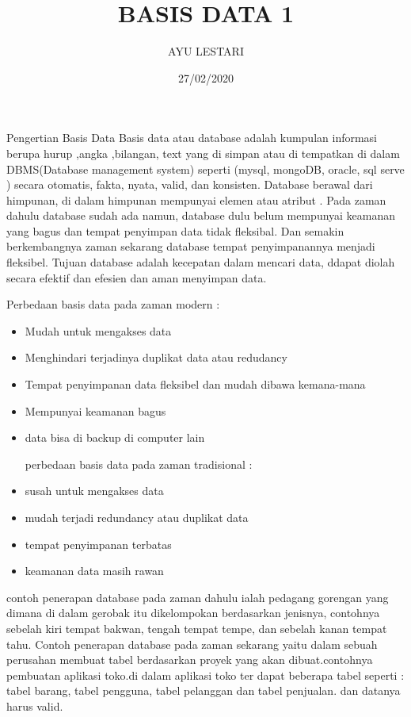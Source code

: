 \documentclass[12pt]{article}
\title{BASIS DATA 1}
\author{AYU LESTARI}
\date{27/02/2020}
\begin{document}
\maketitle
Pengertian Basis Data
Basis data atau database adalah kumpulan informasi berupa  hurup ,angka ,bilangan, text yang di simpan atau di tempatkan di dalam DBMS(Database management system)  seperti (mysql, mongoDB, oracle, sql serve ) secara otomatis, fakta, nyata, valid, dan konsisten. Database berawal dari himpunan, di dalam himpunan mempunyai  elemen atau atribut .  Pada zaman dahulu database sudah ada namun, database dulu belum mempunyai keamanan yang bagus dan tempat penyimpan data tidak fleksibal. Dan semakin berkembangnya zaman  sekarang database tempat penyimpanannya menjadi fleksibel. Tujuan database adalah kecepatan dalam mencari data, ddapat diolah secara efektif dan efesien  dan aman menyimpan data.

Perbedaan   basis data  pada zaman modern :
\begin{itemize}
  \item	Mudah untuk  mengakses data 
  \item Menghindari terjadinya duplikat data atau redudancy
  \item Tempat penyimpanan data  fleksibel dan mudah dibawa kemana-mana
  \item Mempunyai  keamanan bagus
  \item data bisa di backup di computer lain\\


\maketitle perbedaan   basis data pada zaman  tradisional :
  \item	susah untuk mengakses data 
  \item	mudah terjadi redundancy atau duplikat data
  \item tempat penyimpanan terbatas
  \item keamanan data masih rawan

\end{itemize}
contoh penerapan  database pada zaman dahulu ialah pedagang gorengan yang dimana di dalam gerobak itu dikelompokan berdasarkan jenisnya, contohnya sebelah kiri tempat bakwan, tengah tempat tempe, dan sebelah kanan tempat tahu.
Contoh penerapan database pada zaman sekarang yaitu dalam sebuah perusahan membuat tabel berdasarkan proyek yang akan dibuat.contohnya pembuatan aplikasi toko.di dalam aplikasi toko ter dapat beberapa tabel seperti : tabel  barang, tabel pengguna, tabel pelanggan dan tabel penjualan. dan datanya harus valid.
\end{document}
